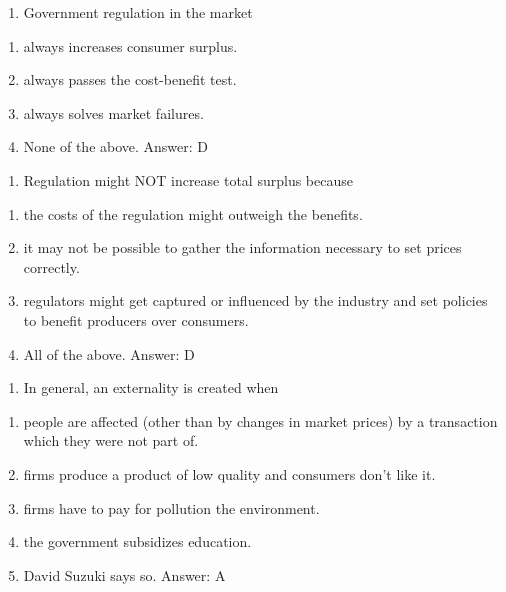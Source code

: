 \documentclass[11pt,]{article}
\providecommand{\tightlist}{%
  \setlength{\itemsep}{0pt}\setlength{\parskip}{0pt}}
\begin{document}
\begin{enumerate}
\def\labelenumi{\arabic{enumi})}
\setcounter{enumi}{11}
\tightlist
\item
  Government regulation in the market
\end{enumerate}

\begin{enumerate}
\def\labelenumi{\Alph{enumi})}
\tightlist
\item
  always increases consumer surplus.
\item
  always passes the cost-benefit test.
\item
  always solves market failures.
\item
  None of the above. Answer: D \newpage
\end{enumerate}

\begin{enumerate}
\def\labelenumi{\arabic{enumi})}
\setcounter{enumi}{12}
\tightlist
\item
  Regulation might NOT increase total surplus because
\end{enumerate}

\begin{enumerate}
\def\labelenumi{\Alph{enumi})}
\tightlist
\item
  the costs of the regulation might outweigh the benefits.
\item
  it may not be possible to gather the information necessary to set
  prices correctly.
\item
  regulators might get captured or influenced by the industry and set
  policies to benefit producers over consumers.
\item
  All of the above. Answer: D
\end{enumerate}

\begin{enumerate}
\def\labelenumi{\arabic{enumi})}
\setcounter{enumi}{13}
\tightlist
\item
  In general, an externality is created when
\end{enumerate}

\begin{enumerate}
\def\labelenumi{\Alph{enumi})}
\tightlist
\item
  people are affected (other than by changes in market prices) by a
  transaction which they were not part of.
\item
  firms produce a product of low quality and consumers don't like it.
\item
  firms have to pay for pollution the environment.
\item
  the government subsidizes education.
\item
  David Suzuki says so. Answer: A
\end{enumerate}
\end{document}
